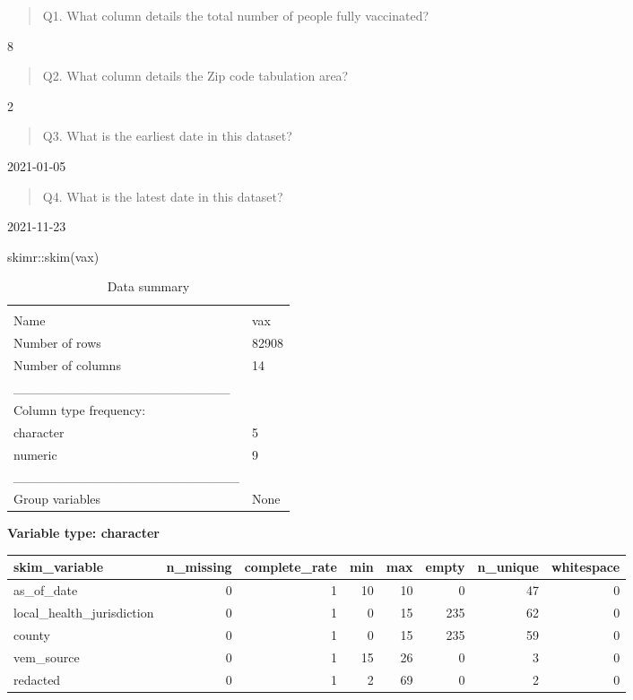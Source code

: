 \documentclass[
]{article}
\newenvironment{Shaded}{\begin{snugshade}}{\end{snugshade}}
\newcommand{\FunctionTok}[1]{\textcolor[rgb]{0.00,0.00,0.00}{#1}}
\newcommand{\NormalTok}[1]{#1}
\newcommand{\SpecialCharTok}[1]{\textcolor[rgb]{0.00,0.00,0.00}{#1}}
\begin{document}
\begin{quote}
Q1. What column details the total number of people fully vaccinated?
\end{quote}

8

\begin{quote}
Q2. What column details the Zip code tabulation area?
\end{quote}

2

\begin{quote}
Q3. What is the earliest date in this dataset?
\end{quote}

2021-01-05

\begin{quote}
Q4. What is the latest date in this dataset?
\end{quote}

2021-11-23

\begin{Shaded}
\begin{Highlighting}[]
\NormalTok{skimr}\SpecialCharTok{::}\FunctionTok{skim}\NormalTok{(vax)}
\end{Highlighting}
\end{Shaded}

\begin{longtable}[]{@{}ll@{}}
\caption{Data summary}\tabularnewline
\toprule
& \\
\midrule
\endfirsthead
\toprule
& \\
\midrule
\endhead
Name & vax \\
Number of rows & 82908 \\
Number of columns & 14 \\
\_\_\_\_\_\_\_\_\_\_\_\_\_\_\_\_\_\_\_\_\_\_\_ & \\
Column type frequency: & \\
character & 5 \\
numeric & 9 \\
\_\_\_\_\_\_\_\_\_\_\_\_\_\_\_\_\_\_\_\_\_\_\_\_ & \\
Group variables & None \\
\bottomrule
\end{longtable}

\textbf{Variable type: character}

\begin{longtable}[]{@{}lrrrrrrr@{}}
\toprule
skim\_variable & n\_missing & complete\_rate & min & max & empty &
n\_unique & whitespace \\
\midrule
\endhead
as\_of\_date & 0 & 1 & 10 & 10 & 0 & 47 & 0 \\
local\_health\_jurisdiction & 0 & 1 & 0 & 15 & 235 & 62 & 0 \\
county & 0 & 1 & 0 & 15 & 235 & 59 & 0 \\
vem\_source & 0 & 1 & 15 & 26 & 0 & 3 & 0 \\
redacted & 0 & 1 & 2 & 69 & 0 & 2 & 0 \\
\bottomrule
\end{longtable}
\end{document}
